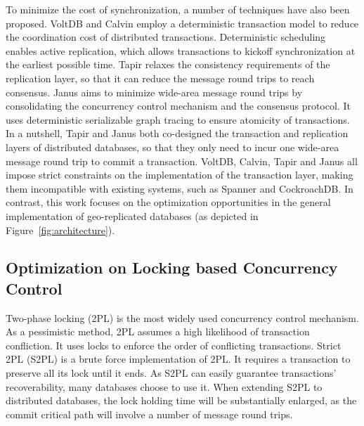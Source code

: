 \documentclass[conference]{IEEEtran}
\begin{document}
To minimize the cost of synchronization, a number of techniques have also been proposed.
VoltDB \cite{VoltDB} and Calvin \cite{Calvin:conf/sigmod/ThomsonDWRSA12} employ a deterministic transaction model
to reduce the coordination cost of distributed transactions.
Deterministic scheduling enables active replication, which allows transactions to kickoff synchronization at the earliest possible time.
Tapir \cite{Tapir:conf/sosp/ZhangSSKP15} relaxes the consistency requirements of the replication layer, so that it can reduce the message round trips to reach consensus.
Janus \cite{Janus:conf/osdi/MuNLL16} aims to minimize wide-area message round trips
by consolidating the concurrency control mechanism and the consensus protocol.
It uses deterministic serializable graph tracing to ensure atomicity of transactions.
In a nutshell, Tapir and Janus both co-designed the transaction and replication layers of distributed databases, so that they only need to incur one wide-area message round trip to commit a transaction.
VoltDB, Calvin, Tapir and Janus all impose strict constraints on the implementation of the transaction layer, making them incompatible with existing systems, such as Spanner and CockroachDB.
In contrast, this work focuses on the optimization opportunities in the general implementation of geo-replicated databases (as depicted in Figure~\ref{fig:architecture}).

\subsection{Optimization on Locking based Concurrency Control}
Two-phase locking (2PL) is the most widely used concurrency control mechanism.
As a pessimistic method, 2PL assumes a high likelihood of transaction confliction.
It uses locks to enforce the order of conflicting transactions.
Strict 2PL (S2PL) is a brute force implementation of 2PL. 
It requires a transaction to preserve all its lock until it ends.
As S2PL can easily guarantee transactions' recoverability, many databases choose to use it.
When extending S2PL to distributed databases, the lock holding time will be substantially enlarged, 
as the commit critical path will involve a number of message round trips.
\end{document}
